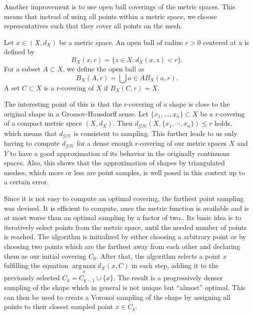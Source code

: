 Another improvement is to use open ball coverings of the metric spaces.
This means that instead of using all points within a metric space, we choose representatives such that they cover all points on the mesh.
\begin{mydef}
	Let $x \in (X,d_X)$ be a metric space. An open ball of radius $r > 0$ centered at x is defined by
	$$B_X(x,r) = \{z\in X:d_X(x,z) < r\}.$$
	For a subset $A \subset X$, we define the open ball as
	$$B_X(A,r) = \bigcup{a\in A} B_X(a,r).$$
	A set $C\subset X$ is a r-covering of $X$ if $B_X(C,r) = X$.
\end{mydef}
The interesting point of this is that the r-covering of a shape is close to the original shape in a Gromov-Hausdorff sense.
Let $\{x_1,\ldots,x_n\}\subset X$ be a r-covering of a compact metric space $(X,d_X)$.
Then $d_\mathcal{GH}(X,\{x_1,\cdots,x_n\}) \le r$ holds, which means that $d_\mathcal{GH}$ is consistent to sampling.
This further leads to us only having to compute $d_\mathcal{GH}$ for a dense enough r-covering of our metric spaces $X$ and $Y$ to have a good approximation of its behavior in the originally continuous spaces.
Also, this shows that the approximation of shapes by triangulated meshes, which more or less are point samples, is well posed in this context up to a certain error.

Since it is not easy to compute an optimal covering, the farthest point sampling was devised.
It is efficient to compute, once the metric function is available and is at most worse than an optimal sampling by a factor of two..
Its basic idea is to iteratively select points from the metric space, until the needed number of points is reached.
The algorithm is initialized by either choosing a arbitrary point or by choosing two points which are the farthest away from each other and declaring them as our initial covering $C_0$.
After that, the algorithm selects a point $x$ fulfilling the equation $\underset{x}{\operatorname{arg\,max}} d_X(x,C)$ in each step, adding it to the previously selected $C_k = C_{k-1} \cup \{x\}$.
The result is a progressively denser sampling of the shape which in general is not unique but ``almost'' optimal.
This can then be used to create a Voronoi sampling of the shape by assigning all points to their closest sampled point $x \in C_k$.
